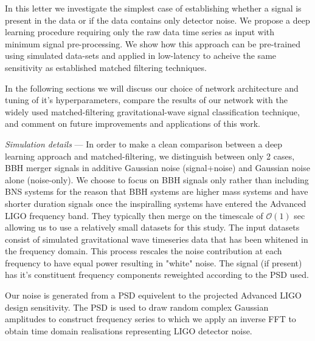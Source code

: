 \documentclass[%
 amsmath,amssymb,
 aps,
 twocolumn,
 prl,
 reprint,
floatfix,
]{revtex4-1}
\begin{document}
%
%
In this letter we investigate the simplest case of establishing whether a
signal is present in the data or if the data contains only detector noise. We
propose a deep learning procedure requiring only the raw data time
series as input with minimum signal pre-processing. We show how this approach
can be pre-trained using simulated data-sets and applied in low-latency 
to acheive the same sensitivity as established matched filtering techniques. 

%
% 
In the following sections we will discuss our choice of network architecture
and tuning of it's hyperparameters, compare the results of our network with the
widely used matched-filtering gravitational-wave signal classification
technique, and comment on future improvements and applications of this work.      

%
%
\textit{Simulation details} --- 
%
%
In order to make a clean comparison between a deep learning approach and
matched-filtering, we distinguish between only 2 cases, \ac{BBH} merger signals
in additive Gaussian noise (signal+noise) and Gaussian noise alone
(noise-only). We choose to focus on \ac{BBH} signals only rather than including
\ac{BNS} systems for the reason that \ac{BBH} systems are higher mass systems
and have shorter duration signals once the inspiralling systems have entered
the Advanced LIGO frequency band. They typically then merge on the timescale of
$\mathcal{O}(1)$ sec allowing us to use a relatively small datasets for this
study. The input datasets consist of simulated gravitational wave timeseries
data that has been whitened in the frequency domain. This process rescales the
noise contribution at each frequency to have equal power resulting in "white"
noise. The signal (if present) has it's constituent frequency components
reweighted according to the \ac{PSD} used.    

%
%
Our noise is generated from a \ac{PSD} equivelent to the projected Advanced
LIGO design sensitivity. The \ac{PSD} is used to draw random complex Gaussian
amplitudes to construct frequency series to which we apply an inverse \ac{FFT}
to obtain time domain realisations representing LIGO detector noise.
\end{document}
